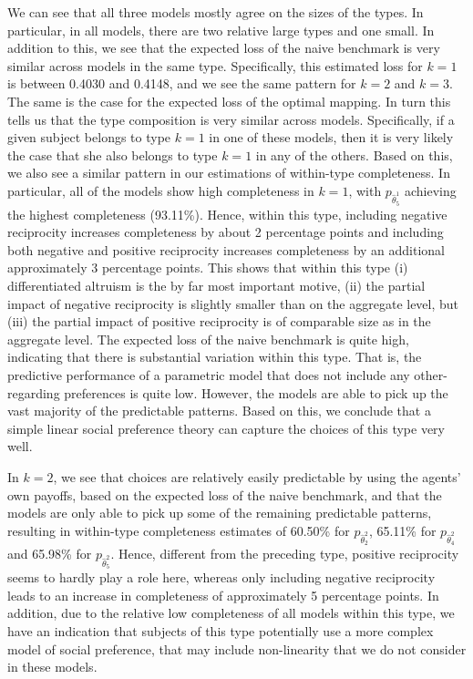 \documentclass[11pt,a4paper]{article}
\theoremstyle{definition}
\begin{document}
We can see that all three models mostly agree on the sizes of the types. In particular, in all models, there are two relative large types and one small. In addition to this, we see that the expected loss of the naive benchmark is very similar across models in the same type. Specifically, this estimated loss for \(k=1\) is between 0.4030 and 0.4148, and we see the same pattern for \(k=2\) and \(k=3\). The same is the case for the expected loss of the optimal mapping. In turn this tells us that the type composition is very similar across models. Specifically, if a given subject belongs to type \(k=1\) in one of these models, then it is very likely the case that she also belongs to type \(k=1\) in any of the others. Based on this, we also see a similar pattern in our estimations of within-type completeness. In particular, all of the models show high completeness in \(k=1\), with \(p_{\hat{\theta}_{5}^1}\) achieving the highest completeness (93.11\%). Hence, within this type, including negative reciprocity increases completeness by about 2 percentage points and including both negative and positive reciprocity increases completeness by an additional approximately 3 percentage points. This shows that within this type (i) differentiated altruism is the by far most important motive, (ii) the partial impact of negative reciprocity is slightly smaller than on the aggregate level, but (iii) the partial impact of positive reciprocity is of comparable size as in the aggregate level. The expected loss of the naive benchmark is quite high, indicating that there is substantial variation within this type. That is, the predictive performance of a parametric model that does not include any other-regarding preferences is quite low. However, the models are able to pick up the vast majority of the predictable patterns. Based on this, we conclude that a simple linear social preference theory can capture the choices of this type very well.

In \(k=2\), we see that choices are relatively easily predictable by using the agents' own payoffs, based on the expected loss of the naive benchmark, and that the models are only able to pick up some of the remaining predictable patterns, resulting in within-type completeness estimates of 60.50\% for \(p_{\hat{\theta}_{2}^2}\), 65.11\% for \(p_{\hat{\theta}_{4}^2}\) and 65.98\% for \(p_{\hat{\theta}_{5}^2}\). Hence, different from the preceding type, positive reciprocity seems to hardly play a role here, whereas only including negative reciprocity leads to an increase in completeness of approximately 5 percentage points. In addition, due to the relative low completeness of all models within this type, we have an indication that subjects of this type potentially use a more complex model of social preference, that may include non-linearity that we do not consider in these models.
\end{document}
